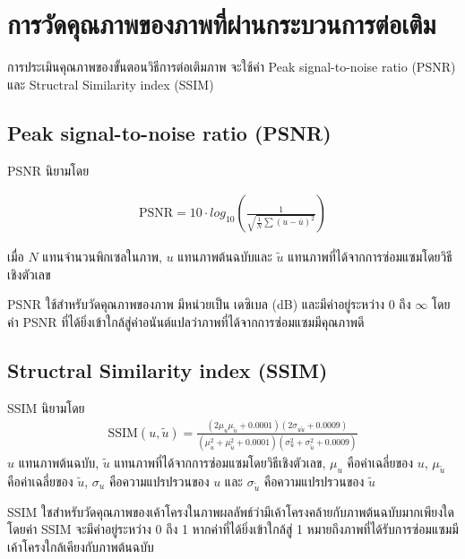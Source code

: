 \section{การวัดคุณภาพของภาพที่ผ่านกระบวนการต่อเติม}

\hspace{1cm} การประเมินคุณภาพของขั้นตอนวิธีการต่อเติมภาพ จะใช้ค่า Peak signal-to-noise ratio (PSNR) \cite{ref:PSNR} และ Structral Similarity index (SSIM) \cite{ref:SSIM} 

\subsection{Peak signal-to-noise ratio (PSNR)}

\hspace{1cm} PSNR นิยามโดย

\begin{align}
	\text{PSNR}  = 10 \cdot log_{10} ( \frac{1}{\sqrt{\frac{1}{N} \sum (u - \bar{u})^2}})
\end{align}

เมื่อ $N$ แทนจำนวนพิกเซลในภาพ, $u$ แทนภาพต้นฉบับและ $\tilde{u}$ แทนภาพที่ได้จากการซ่อมแซมโดยวิธีเชิงตัวเลข

\hspace{1cm} PSNR ใช้สำหรับวัดคุณภาพของภาพ มีหน่วยเป็น เดซิเบล (dB) และมีค่าอยู่ระหว่าง 0 ถึง $\infty$ โดยค่า PSNR ที่ได้ยิ่งเข้าใกล้สู่ค่าอนันต์แปลว่าภาพที่ได้จากการซ่อมแซมมีคุณภาพดี

\subsection{Structral Similarity index (SSIM)}
\hspace{1cm} SSIM นิยามโดย
\begin{align*}
	\text{SSIM}(u,\tilde{u}) = \frac{(2\mu_u\mu_{\tilde{u}} + 0.0001)(2\sigma_{u\tilde{u}} + 0.0009)}{(\mu_u^2+\mu_{\tilde{u}}^2+0.0001)(\sigma_u^2+\sigma_{\tilde{u}}^2+0.0009)}
\end{align*}
$u$ แทนภาพต้นฉบับ, $\tilde{u}$ แทนภาพที่ได้จากการซ่อมแซมโดยวิธีเชิงตัวเลข,  $\mu_u$ คือค่าเฉลี่ยของ $u$, $\mu_{\tilde{u}}$ คือค่าเฉลี่ยของ $\tilde{u}$, $\sigma_u$ คือความแปรปรวนของ $u$ และ $\sigma_{\tilde{u}}$ คือความแปรปรวนของ $\tilde{u}$

\hspace{1cm} SSIM ใชสำหรับวัดคุณภาพของเค้าโครงในภาพผลลัพธ์ว่ามีเค้าโครงคล้ายกับภาพต้นฉบับมากเพียงใด โดยค่า SSIM จะมีค่าอยู่ระหว่าง 0 ถึง 1 หากค่าที่ได้ยิ่งเข้าใกล้สู่ 1 หมายถึงภาพที่ได้รับการซ่อมแซมมีเค้าโครงใกล้เคียงกับภาพต้นฉบับ